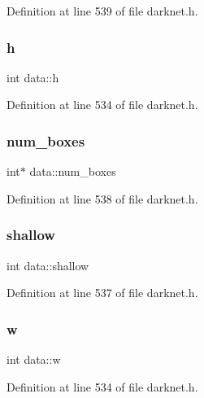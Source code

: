 Definition at line 539 of file darknet.\+h.

\mbox{\label{structdata_adbac4a041922ac9e6c47953f5fa23126}} 
\subsubsection{\texorpdfstring{h}{h}}
{\footnotesize\ttfamily int data\+::h}



Definition at line 534 of file darknet.\+h.

\mbox{\label{structdata_afba4d3b06050db7a30b0b11809ae6e23}} 
\subsubsection{\texorpdfstring{num\_boxes}{num\_boxes}}
{\footnotesize\ttfamily int$\ast$ data\+::num\+\_\+boxes}



Definition at line 538 of file darknet.\+h.

\mbox{\label{structdata_a3ef4c4e942b1f2b6a5e64e7fb7e12491}} 
\subsubsection{\texorpdfstring{shallow}{shallow}}
{\footnotesize\ttfamily int data\+::shallow}



Definition at line 537 of file darknet.\+h.

\mbox{\label{structdata_a9de96028e1598b323d91ffb059cd48b2}} 
\subsubsection{\texorpdfstring{w}{w}}
{\footnotesize\ttfamily int data\+::w}



Definition at line 534 of file darknet.\+h.

\mbox{\label{structdata_a1f37ae26b26b12ef5c70a12957826e87}} 
